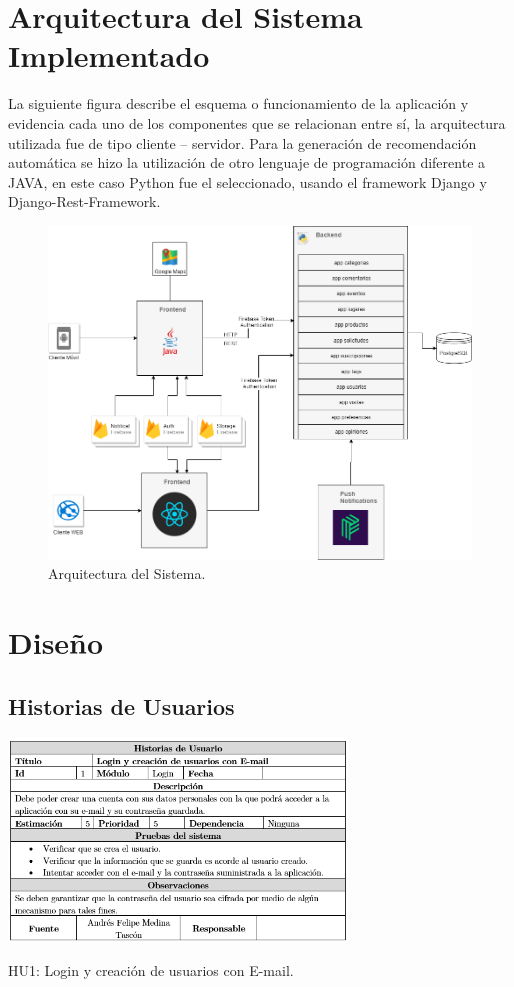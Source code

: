 \documentclass[12pt,letterpaper,openany]{book}
\begin{document}
\section{Arquitectura del Sistema Implementado}
La siguiente figura describe el esquema o funcionamiento de la aplicación y evidencia cada uno de los componentes que se relacionan entre sí, la arquitectura utilizada fue de tipo cliente – servidor. Para la generación de recomendación automática se hizo la utilización de otro lenguaje de programación diferente a JAVA, en este caso Python fue el seleccionado, usando el framework Django y Django-Rest-Framework.
\begin{figure}[H]
\begin{center}
\includegraphics[width=13cm]{./imagenes/arquitectura}
\caption{Arquitectura del Sistema.}
\end{center}
\end{figure}


\section{Diseño}
\subsection{Historias de Usuarios}
\begin{table}[H]
\centering
\includegraphics[width=9cm]{./imagenes/HU/HU1}
\caption{HU1: Login y creación de usuarios con E-mail.}
\end{table}
\end{document}
